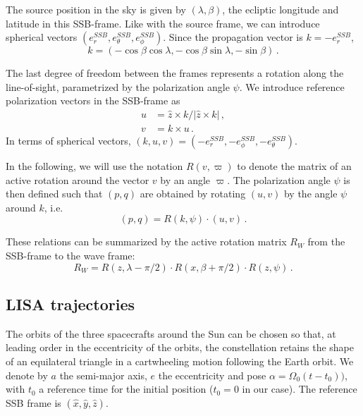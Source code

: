 \documentclass[aps,showpacs,twocolumn,prd,superscriptaddress,nofootinbib]{revtex4-1}
\newcommand{\be}{\begin{equation}}
\newcommand{\ee}{\end{equation}}
\newcommand{\bsub}{\begin{subequations}}
\newcommand{\esub}{\end{subequations}}
\begin{document}
The source position in the sky is given by $(\lambda, \beta)$, the ecliptic longitude and latitude in this SSB-frame. Like with the source frame, we can introduce spherical vectors $(e_{r}^{SSB}, e_{\theta}^{SSB}, e_{\phi}^{SSB})$. Since the propagation vector is $k = - e_{r}^{SSB}$,
\be
	k = (- \cos\beta\cos\lambda, - \cos\beta\sin\lambda, -\sin\beta) \,.
\ee

The last degree of freedom between the frames represents a rotation along the line-of-sight, parametrized by the polarization angle $\psi$. We introduce reference polarization vectors in the SSB-frame as
\bsub
\begin{align}
	u &= \hat{z} \times k / |\hat{z} \times k| \,,\\
	v &= k \times u \,.
\end{align}
\esub
In terms of spherical vectors, $(k, u, v) = (-e_{r}^{SSB}, -e_{\phi}^{SSB}, -e_{\theta}^{SSB})$.

In the following, we will use the notation $R(v,\varpi)$ to denote the matrix of an active rotation around the vector $v$ by an angle $\varpi$. The polarization angle $\psi$ is then defined such that $(p,q)$ are obtained by rotating $(u,v)$ by the angle $\psi$ around $k$, i.e.
\be
	(p,q) = R(k, \psi) \cdot (u,v) \,.
\ee

These relations can be summarized by the active rotation matrix $R_{W}$ from the SSB-frame to the wave frame:
\be\label{eq:RW}
	R_{W} = R(z, \lambda - \pi/2) \cdot R(x, \beta + \pi/2 ) \cdot R(z, \psi)\,.
\ee


\subsection{LISA trajectories}
\label{app:lisatraj}

The orbits of the three spacecrafts around the Sun can be chosen so that, at leading order in the eccentricity of the orbits, the constellation retains the shape of an equilateral triangle in a cartwheeling motion following the Earth orbit. We denote by $a$ the semi-major axis, $e$ the eccentricity and pose $\alpha = \Omega_{0} (t-t_{0}))$, with $t_{0}$ a reference time for the initial position ($t_{0} = 0$ in our case). The reference SSB frame is $(\hat{x}, \hat{y}, \hat{z})$.
\end{document}
